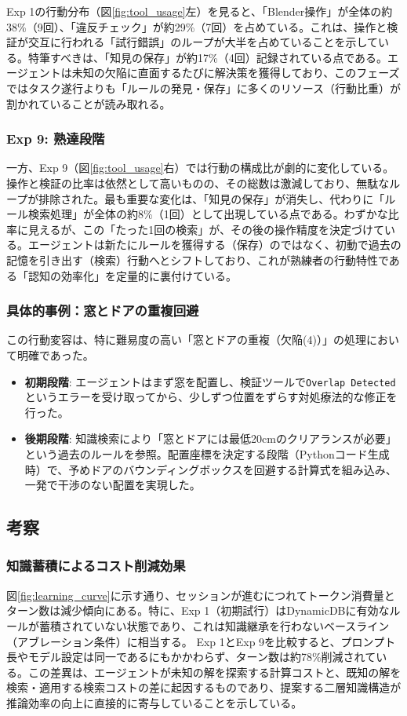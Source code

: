 \documentclass[dvipdfmx, a4paper, 9pt]{deimj}
\begin{document}
Exp 1の行動分布（図\ref{fig:tool_usage}左）を見ると、「Blender操作」が全体の約38\%（9回）、「違反チェック」が約29\%（7回）を占めている。これは、操作と検証が交互に行われる「試行錯誤」のループが大半を占めていることを示している。特筆すべきは、「知見の保存」が約17\%（4回）記録されている点である。エージェントは未知の欠陥に直面するたびに解決策を獲得しており、このフェーズではタスク遂行よりも「ルールの発見・保存」に多くのリソース（行動比重）が割かれていることが読み取れる。

\subsubsection{Exp 9: 熟達段階}

一方、Exp 9（図\ref{fig:tool_usage}右）では行動の構成比が劇的に変化している。操作と検証の比率は依然として高いものの、その総数は激減しており、無駄なループが排除された。最も重要な変化は、「知見の保存」が消失し、代わりに「ルール検索処理」が全体の約8\%（1回）として出現している点である。わずかな比率に見えるが、この「たった1回の検索」が、その後の操作精度を決定づけている。エージェントは新たにルールを獲得する（保存）のではなく、初動で過去の記憶を引き出す（検索）行動へとシフトしており、これが熟練者の行動特性である「認知の効率化」を定量的に裏付けている。

\subsubsection{具体的事例：窓とドアの重複回避}

この行動変容は、特に難易度の高い「窓とドアの重複（欠陥(4)）」の処理において明確であった。

\begin{itemize}
  \item \textbf{初期段階}: エージェントはまず窓を配置し、検証ツールで\texttt{Overlap Detected}というエラーを受け取ってから、少しずつ位置をずらす対処療法的な修正を行った。
  \item \textbf{後期段階}: 知識検索により「窓とドアには最低20cmのクリアランスが必要」という過去のルールを参照。配置座標を決定する段階（Pythonコード生成時）で、予めドアのバウンディングボックスを回避する計算式を組み込み、一発で干渉のない配置を実現した。
\end{itemize}

\subsection{考察}

\subsubsection{知識蓄積によるコスト削減効果}
図\ref{fig:learning_curve}に示す通り、セッションが進むにつれてトークン消費量とターン数は減少傾向にある。特に、Exp 1（初期試行）はDynamicDBに有効なルールが蓄積されていない状態であり、これは知識継承を行わないベースライン（アブレーション条件）に相当する。
Exp 1とExp 9を比較すると、プロンプト長やモデル設定は同一であるにもかかわらず、ターン数は約78\%削減されている。この差異は、エージェントが未知の解を探索する計算コストと、既知の解を検索・適用する検索コストの差に起因するものであり、提案する二層知識構造が推論効率の向上に直接的に寄与していることを示している。
\end{document}
